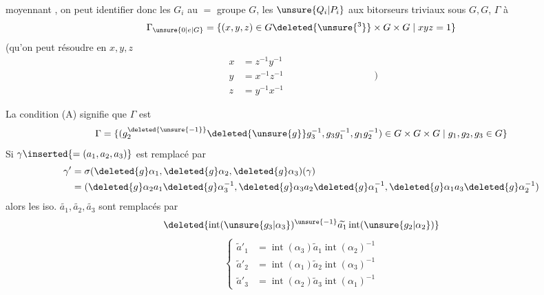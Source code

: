 moyennant , on peut identifier donc les \(G_i\) au \(=\) groupe \(G\), les \(\unsure{Q_i|P_i}\) aux bitorseurs triviaux sous \(G,G\), \(\Gamma\) à
\[
 \Gamma_{\unsure{0|e|G}}=\{(x,y,z)\in G\deleted{\unsure{^3}}\times G\times G\mid xyz=1\}
\]
(qu'on peut résoudre en \(x,y,z\)
\[
\begin{aligned}
 x&=z^{-1}y^{-1}\\
 y&=x^{-1}z^{-1}\\
 z&=y^{-1}x^{-1}
\end{aligned}\hspace{9em}\biggr)
\]

La condition (A) signifie que \(\Gamma\) est  
\[
 \Gamma=\{(g_2^{\deleted{\unsure{-1}}}\deleted{\unsure{g}}g_3^{-1},g_3g_1^{-1},g_1g_2^{-1})
 \in G\times G\times G\mid g_1,g_2,g_3\in G\}
\]
Si \(\gamma\inserted{=(a_1,a_2,a_3)}\) est remplacé par
\[
\begin{aligned}
 \gamma'&=\sigma(\deleted{g}\alpha_1,\deleted{g}\alpha_2,\deleted{g}\alpha_3)(\gamma)\\
 &=(\deleted{g}\alpha_2 a_1\deleted{g}\alpha_3^{-1},\deleted{g}\alpha_3 a_2\deleted{g}\alpha_1^{-1},
 \deleted{g}\alpha_1 a_3\deleted{g}\alpha_2^{-1})
\end{aligned}
\]
alors les iso. \(\widetilde{a_{1}},\widetilde{a_{2}},\widetilde{a_{3}}\) sont remplacés par
\[
 \deleted{\operatorname{int}(\unsure{g_3|\alpha_3})^{\unsure{-1}}\widetilde{a_{1}}\operatorname{int}(\unsure{g_2|\alpha_2})}
\]
\[
 \left\{\begin{aligned}
 \widetilde a'_1&=\operatorname{int}(\alpha_3)\widetilde a_1\operatorname{int}(\alpha_2)^{-1}\\
 \widetilde a'_2&=\operatorname{int}(\alpha_1)\widetilde a_2\operatorname{int}(\alpha_3)^{-1}\\
 \widetilde a'_3&=\operatorname{int}(\alpha_2)\widetilde a_3\operatorname{int}(\alpha_1)^{-1}
 \end{aligned}\right.
\]
